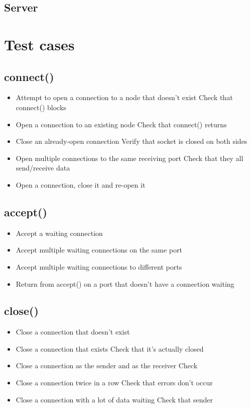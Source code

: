 \documentclass[]{article}
\begin{document}
\subsection{Server}

\section{Test cases}
\subsection{connect()}
\begin{itemize}
	\item Attempt to open a connection to a node that doesn't exist
	\subitem Check that connect() blocks
	\item Open a connection to an existing node
	\subitem Check that connect() returns
	\item Close an already-open connection
	\subitem Verify that socket is closed on both sides
	\item Open multiple connections to the same receiving port
	\subitem Check that they all send/receive data
	\item Open a connection, close it and re-open it
\end{itemize}
\subsection{accept()}
\begin{itemize}
	\item Accept a waiting connection
	\item Accept multiple waiting connections on the same port
	\item Accept multiple waiting connections to different ports
	\item Return from accept() on a port that doesn't have a connection waiting
\end{itemize}
\subsection{close()}
\begin{itemize}
	\item Close a connection that doesn't exist
	\item Close a connection that exists
	\subitem Check that it's actually closed
	\item Close a connection as the sender and as the receiver
	\subitem Check 
	\item Close a connection twice in a row
	\subitem Check that errors don't occur
	\item Close a connection with a lot of data waiting
	\subitem Check that sender 
\end{itemize}
\end{document}
